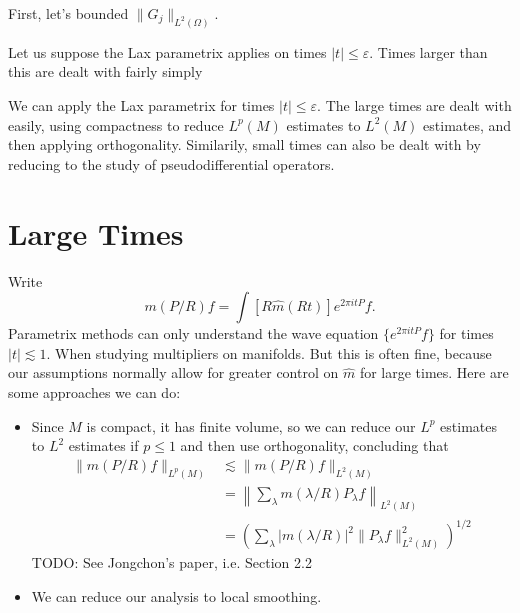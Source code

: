 First, let's bounded $\| G_j \|_{L^2(\Omega)}$.







Let us suppose the Lax parametrix applies on times $|t| \leq \varepsilon$. Times larger than this are dealt with fairly simply

We can apply the Lax parametrix for times $|t| \leq \varepsilon$. The large times are dealt with easily, using compactness to reduce $L^p(M)$ estimates to $L^2(M)$ estimates, and then applying orthogonality. Similarily, small times can also be dealt with by reducing to the study of pseudodifferential operators.














\chapter{Large Times}

Write
%
\[ m(P/R) f = \int [ R \widehat{m}(Rt) ] e^{2 \pi i t P} f. \]
%
Parametrix methods can only understand the wave equation $\{ e^{2 \pi i t P} f \}$ for times $|t| \lesssim 1$. When studying multipliers on manifolds. But this is often fine, because our assumptions normally allow for greater control on $\widehat{m}$ for large times. Here are some approaches we can do:
%
\begin{itemize}
    \item Since $M$ is compact, it has finite volume, so we can reduce our $L^p$ estimates to $L^2$ estimates if $p \leq 1$ and then use orthogonality, concluding that
    \begin{align*}
        \| m(P/R) f \|_{L^p(M)} &\lesssim \| m(P/R) f \|_{L^2(M)}\\
        &= \left\| \sum_\lambda m(\lambda/R) P_\lambda f \right\|_{L^2(M)}\\
        &= \left( \sum_\lambda |m(\lambda/R)|^2 \| P_\lambda f \|_{L^2(M)}^2 \right)^{1/2}
    \end{align*}
    TODO: See Jongchon's paper, i.e. Section 2.2

    \item We can reduce our analysis to local smoothing.
\end{itemize}








